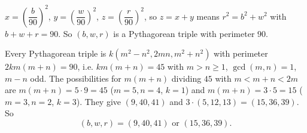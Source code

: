 $x=\left(\dfrac {b}{90}\right)^2$, $y=\left(\dfrac {w}{90}\right)^2$, $z=\left(\dfrac {r}{90}\right)^2$, so $z=x+y$ means $r^2=b^2+w^2$ with $b+w+r=90$. So $(b,w,r)$ is a Pythagorean triple with perimeter $90$.

Every Pythagorean triple is $k(m^2-n^2,2mn,m^2+n^2)$ with perimeter $2km(m+n)=90$, i.e. $km(m+n)=45$ with $m>n\ge1$, $\gcd(m,n)=1$, $m-n$ odd. The possibilities for $m(m+n)$ dividing $45$ with $m<m+n<2m$ are $m(m+n)=5\cdot9=45$ ($m=5,n=4$, $k=1$) and $m(m+n)=3\cdot5=15$ ($m=3,n=2$, $k=3$). They give $(9,40,41)$ and $3\cdot(5,12,13)=(15,36,39)$. So
\[
\boxed{(b,w,r)=(9,40,41)\text{ or }(15,36,39)}.
\]
